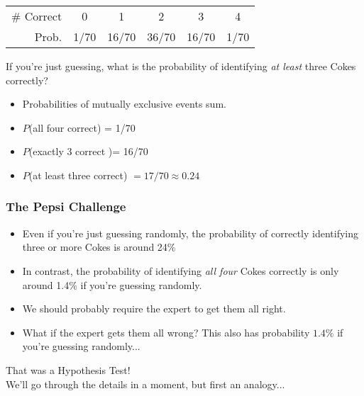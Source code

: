 \documentclass{beamer}
\begin{document}
\begin{frame}
	\begin{center}
		\begin{tabular}{rccccc}
		\hline
		\# Correct & 0 & 1 & 2 & 3 & 4\\
		Prob.&1/70 & 16/70 & 36/70 & 16/70 &1/70\\
		\hline
		\end{tabular}
	\end{center}
	If you're just guessing, what is the probability of identifying \alert{\emph{at least}} three Cokes correctly?
	\pause
	\begin{itemize}
\item Probabilities of mutually exclusive events sum. 
\item $P$(all four correct) = 1/70 
\item $P$(exactly 3 correct )= 16/70 
\item $P$(at least three correct) $ = 17/70 \approx 0.24$

\end{itemize}
\end{frame}

\begin{frame}
\frametitle{The Pepsi Challenge}
	\begin{itemize}
\item Even if you're just guessing randomly, the probability of correctly identifying three or more Cokes is around 24\% 
\item In contrast, the probability of identifying \emph{\alert{all four}} Cokes correctly is only around 1.4\% if you're guessing randomly. 
\item We should probably require the expert to get them all right. 
\item What if the expert gets them all wrong? This also has probability $1.4\%$ if you're guessing randomly...
\end{itemize}
\end{frame}


\begin{frame}
	\begin{center}
	\huge That was a Hypothesis Test!\\
	\normalsize We'll go through the details in a moment, but first an analogy...
	\end{center}
\end{frame}
\end{document}
